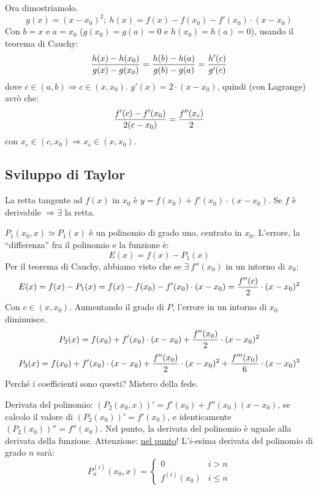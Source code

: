 \documentclass[12pt,a4paper]{article}
\begin{document}
Ora dimostriamolo.
$$
g(x) = (x - x_0)^2 ; \ 
h(x) = f(x) - f(x_0) - f'(x_0) \cdot (x - x_0)
$$
Con $b=x$ e $a=x_0$ ($g(x_0) = g(a) = 0$ e $h(x_0) = h(a) = 0$), 
usando il teorema di Cauchy:
$$
{h(x) - h(x_0) \over g(x) - g(x_0)} = 
{h(b) - h(a) \over g(b) - g(a)} = 
{h'(c) \over g'(c)}
$$
dove $c \in (a,b) \Rightarrow c \in (x,x_0)$. $g'(x) = 2 \cdot 
(x - x_0)$, quindi (con Lagrange) avr\`o che:
$$
{f'(c) - f'(x_0) \over 2(c - x_0)} = {f''(x_c) \over 2}
$$
con $x_c \in (c, x_0) \Rightarrow x_c \in (x, x_0)$.

\subsection{Sviluppo di Taylor}
La retta tangente ad $f(x)$ in $x_0$ \`e $y = f(x_0) + f'(x_0) \cdot
(x - x_0)$. Se $f$ \`e derivabile $\Rightarrow \exists$ la retta.

$P_1(x_0,x) \simeq P_1(x)$ \`e un polinomio di grado uno, centrato
in $x_0$. L'errore, la ``differenza'' fra il polinomio e la funzione
\`e:
$$
E(x) = f(x) - P_1(x)
$$
Per il teorema di Cauchy, abbiamo visto che se $\exists \ f''(x_0)$ in
un intorno di $x_0$:
$$
E(x) = f(x) - P_1(x) = f(x) - f(x_0) - f'(x_0) \cdot (x - x_0) =
{f''(c) \over 2} \cdot (x - x_0)^2
$$
Con $c \in (x, x_0)$. Aumentando il grado di $P$, l'errore in un intorno
di $x_0$ diminuisce.
$$
P_2(x) = f(x_0) + f'(x_0) \cdot (x - x_0) + {f''(x_0) \over 2} \cdot 
(x - x_0)^2
$$
$$
P_3(x) = f(x_0) + f'(x_0) \cdot (x - x_0) + {f''(x_0) \over 2} \cdot 
(x - x_0)^2 + {f'''(x_0) \over 6} \cdot (x - x_0)^3
$$
Perch\'e i coefficienti sono questi? Mistero della fede.

Derivata del polinomio: 
$\left( P_2(x_0,x) \right)' = f'(x_0) + f''(x_0)(x - x_0)$, se calcolo il
valore di $\left( P_2(x_0) \right)' = f'(x_0)$, e identicamente 
$\left( P_2(x_0) \right)'' = f''(x_0)$. Nel punto, la derivata del polinomio
\`e uguale alla derivata della funzione. Attenzione: \underline{nel punto}!
L'$i$-esima derivata del polinomio di grado $n$ sar\`a:
$$
P_n^{(i)}(x_0,x) = \begin{cases}
0 & i > n \\
f^{(i)} (x_0) & i \leq n
\end{cases}
$$
\end{document}
